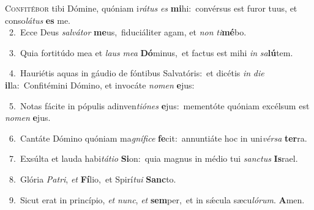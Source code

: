 \lettrine{\initial\textcolor{\initialcolor}{C}}{onfitébor} tibi Dómine, quóniam i\-\textit{rá}\-\textit{tus} \textit{es} \textbf{mi}\-hi:~\star convérsus est furor tuus, et conso\-\textit{lá}\-\textit{tus} \textbf{es} me.\\
{\numbfont\textcolor{\numbcolor}{~2.}}~Ecce Deus \textit{sal}\-\textit{vá}\textit{tor} \textbf{me}\-us,~\star fiduciáliter agam, et \textit{non} \textit{ti}\-\textbf{mé}bo.\par
{\numbfont\textcolor{\numbcolor}{~3.}}~Quia fortitúdo mea et \textit{laus} \textit{me}\-\textit{a} \textbf{Dó}\-minus,~\star et factus est mihi \textit{in} \textit{sa}\-\textbf{lú}tem.\par
{\numbfont\textcolor{\numbcolor}{~4.}}~Hauriétis aquas in gáudio de fóntibus Salvatóris:~\dagger et dicétis \textit{in} \textit{di}\-\textit{e} \textbf{il}\-la:~\star Confitémini Dómino, et invocáte \textit{no}\-\textit{men} \textbf{e}\-jus:\par
{\numbfont\textcolor{\numbcolor}{~5.}}~Notas fácite in pópulis adinven\-\textit{ti}\-\textit{ó}\textit{nes} \textbf{e}\-jus:~\star mementóte quóniam excélsum est \textit{no}\-\textit{men} \textbf{e}\-jus.\par
{\numbfont\textcolor{\numbcolor}{~6.}}~Cantáte Dómino quóniam ma\-\textit{gní}\-\textit{fi}\textit{ce} \textbf{fe}\-cit:~\star annuntiáte hoc in uni\-\textit{vér}\-\textit{sa} \textbf{ter}\-ra.\par
{\numbfont\textcolor{\numbcolor}{~7.}}~Exsúlta et lauda habi\-\textit{tá}\-\textit{ti}\textit{o} \textbf{Si}\-on:~\star quia magnus in médio tui \textit{sanc}\-\textit{tus} \textbf{Is}\-rael.\par
{\numbfont\textcolor{\numbcolor}{~8.}}~Glória \textit{Pa}\-\textit{tri}, \textit{et} \textbf{Fí}\-lio,~\star et Spirí\-\textit{tu}\-\textit{i} \textbf{Sanc}\-to.\par
{\numbfont\textcolor{\numbcolor}{~9.}}~Sicut erat in princípio, \textit{et} \textit{nunc}\-, \textit{et} \textbf{sem}\-per,~\star et in sǽcula sæcu\-\textit{ló}\-\textit{rum}. \textbf{A}\-men.\par
